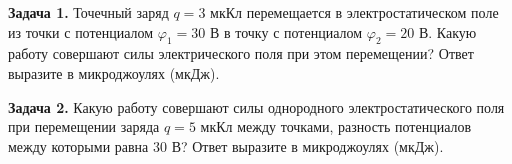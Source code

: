 
\begin{taskbasic}[code={\label{task:elem_pot_v13_n11}}]
\textbf{Задача 1.} Точечный заряд $q = 3\text{ мкКл}$ перемещается в электростатическом поле из точки с потенциалом $\varphi_1 = 30\text{ В}$ в точку с потенциалом $\varphi_2 = 20\text{ В}$. Какую работу совершают силы электрического поля при этом перемещении? Ответ выразите в микроджоулях (мкДж).

\end{taskbasic}

\begin{taskbasic}[code={\label{task:elem_pot_v14_n11}}]
\textbf{Задача 2.} Какую работу совершают силы однородного электростатического поля при перемещении заряда $q = 5\text{ мкКл}$ между точками, разность потенциалов между которыми равна $30\text{ В}$? Ответ выразите в микроджоулях (мкДж).

\end{taskbasic}


